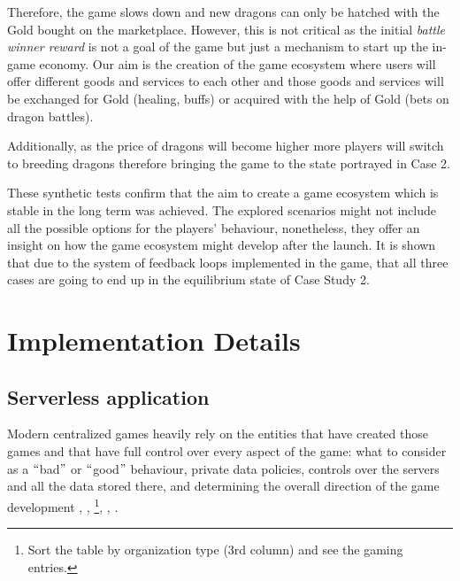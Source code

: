 \documentclass[12pt]{article}
\begin{document}


Therefore, the game slows down and new dragons can only be hatched with the Gold bought on the marketplace. However, this is not critical as the initial \textit{battle winner reward }is not a goal of the game but just a mechanism to start up the in-game economy. Our aim is the creation of the game ecosystem where users will offer different goods and services to each other and those goods and services will be exchanged for Gold (healing, buffs) or acquired with the help of Gold (bets on dragon battles).\par

Additionally, as the price of dragons will become higher more players will switch to breeding dragons therefore bringing the game to the state portrayed in Case 2.\par

These synthetic tests confirm that the aim to create a game ecosystem which is stable in the long term was achieved. The explored scenarios might not include all the possible options for the players’ behaviour, nonetheless, they offer an insight on how the game ecosystem might develop after the launch. It is shown that due to the system of feedback loops implemented in the game, that all three cases are going to end up in the equilibrium state of Case Study 2.\par


\newpage

\vspace{\baselineskip}\section{Implementation Details}
\label{Implementation Details}  \par

\subsection{Serverless application}
\label{Serverless application} \par

Modern centralized games heavily rely on the entities that have created those games and that have full control over every aspect of the game: what to consider as a $``$bad$"$  or $``$good$"$  behaviour, private data policies, controls over the servers and all the data stored there, and determining the overall direction of the game development  \cite{Gogo_2018_Jun_16},  \cite{Steam_2017},  \cite{WikipediA_2018}\footnote{Sort the table by organization type (3rd column) and see the gaming entries.}, \cite{Ben_Gilbert_2018_Jun_22},  \cite{Aaron_Mamiit__2017_Mar_30}.\par
\end{document}
